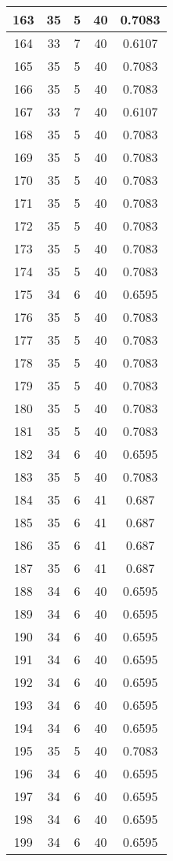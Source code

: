\documentclass[letterpaper, 12pt]{article}
\begin{document}
\begin{longtable}{|c|c|c|c|c|}
\hline
163 & 35 & 5 & 40 & 0.7083 \\
\hline
164 & 33 & 7 & 40 & 0.6107 \\
\hline
165 & 35 & 5 & 40 & 0.7083 \\
\hline
166 & 35 & 5 & 40 & 0.7083 \\
\hline
167 & 33 & 7 & 40 & 0.6107 \\
\hline
168 & 35 & 5 & 40 & 0.7083 \\
\hline
169 & 35 & 5 & 40 & 0.7083 \\
\hline
170 & 35 & 5 & 40 & 0.7083 \\
\hline
171 & 35 & 5 & 40 & 0.7083 \\
\hline
172 & 35 & 5 & 40 & 0.7083 \\
\hline
173 & 35 & 5 & 40 & 0.7083 \\
\hline
174 & 35 & 5 & 40 & 0.7083 \\
\hline
175 & 34 & 6 & 40 & 0.6595 \\
\hline
176 & 35 & 5 & 40 & 0.7083 \\
\hline
177 & 35 & 5 & 40 & 0.7083 \\
\hline
178 & 35 & 5 & 40 & 0.7083 \\
\hline
179 & 35 & 5 & 40 & 0.7083 \\
\hline
180 & 35 & 5 & 40 & 0.7083 \\
\hline
181 & 35 & 5 & 40 & 0.7083 \\
\hline
182 & 34 & 6 & 40 & 0.6595 \\
\hline
183 & 35 & 5 & 40 & 0.7083 \\
\hline
184 & 35 & 6 & 41 & 0.687 \\
\hline
185 & 35 & 6 & 41 & 0.687 \\
\hline
186 & 35 & 6 & 41 & 0.687 \\
\hline
187 & 35 & 6 & 41 & 0.687 \\
\hline
188 & 34 & 6 & 40 & 0.6595 \\
\hline
189 & 34 & 6 & 40 & 0.6595 \\
\hline
190 & 34 & 6 & 40 & 0.6595 \\
\hline
191 & 34 & 6 & 40 & 0.6595 \\
\hline
192 & 34 & 6 & 40 & 0.6595 \\
\hline
193 & 34 & 6 & 40 & 0.6595 \\
\hline
194 & 34 & 6 & 40 & 0.6595 \\
\hline
195 & 35 & 5 & 40 & 0.7083 \\
\hline
196 & 34 & 6 & 40 & 0.6595 \\
\hline
197 & 34 & 6 & 40 & 0.6595 \\
\hline
198 & 34 & 6 & 40 & 0.6595 \\
\hline
199 & 34 & 6 & 40 & 0.6595 \\
\hline
\end{longtable}
\end{document}

